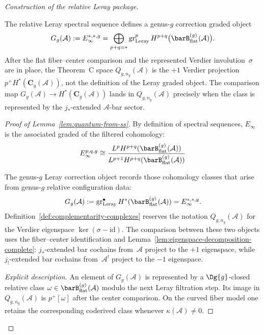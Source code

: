 \begin{proof}[Construction of the relative Leray package]
\begin{lemma}
\label{lem:quantum-from-ss}
The relative Leray spectral sequence defines a genus-$g$ correction
graded object
\begin{equation}
G_g(\mathcal{A})
:= E_\infty^{*,*,g}
= \bigoplus_{p+q=*}
\operatorname{gr}^{p}_{\mathrm{Leray}}
H^{p+q}\bigl(\barB^{(g)}_{\mathrm{flat}}(\mathcal{A})\bigr).
\end{equation}
After the flat fiber--center comparison and the represented Verdier
involution~$\sigma$ are in place, the Theorem~C space
$Q_{g,n_g}(\mathcal{A})$ is the $+1$ Verdier projection
$p^+H^*(\mathbf{C}_g(\mathcal{A}))$, not the definition of the
Leray graded object. The comparison map
$G_g(\mathcal{A})\to H^*(\mathbf{C}_g(\mathcal{A}))$ lands in
$Q_{g,n_g}(\mathcal{A})$ precisely when the class is represented by the
$j_*$-extended $\mathcal{A}$-bar sector.
\end{lemma}

\begin{proof}[Proof of Lemma~\ref{lem:quantum-from-ss}]
By definition of spectral sequences, $E_\infty$ is the associated graded of the
filtered cohomology:
\begin{equation}
E_\infty^{p,q,g} \cong
\frac{L^p H^{p+q}(\barB^{(g)}_{\mathrm{flat}}(\mathcal{A}))}
{L^{p+1} H^{p+q}(\barB^{(g)}_{\mathrm{flat}}(\mathcal{A}))}
\end{equation}

The genus-$g$ Leray correction object records those cohomology
classes that arise from genus-$g$ relative configuration data:
\begin{equation}
G_g(\mathcal{A}) :=
\operatorname{gr}^{\bullet}_{\mathrm{Leray}}
H^*(\barB^{(g)}_{\mathrm{flat}}(\mathcal{A}))
= E_\infty^{*,*,g}.
\end{equation}
Definition~\ref{def:complementarity-complexes} reserves the notation
$Q_{g,n_g}(\mathcal{A})$ for the Verdier eigenspace
$\ker(\sigma-\mathrm{id})$. The comparison between these two objects
uses the fiber--center identification and
Lemma~\ref{lem:eigenspace-decomposition-complete}: $j_*$-extended
bar cochains from~$\mathcal{A}$ project to the $+1$ eigenspace, while
$j_!$-extended bar cochains from~$\mathcal{A}^!$ project to the
$-1$ eigenspace.

\emph{Explicit description.} An element of $G_g(\mathcal{A})$ is
represented by a $\Dg{g}$-closed relative class
$\omega \in \barB^{(g)}_{\mathrm{flat}}(\mathcal{A})$ modulo the
next Leray filtration step. Its image in $Q_{g,n_g}(\mathcal{A})$ is
$p^+[\omega]$ after the center comparison. On the curved fiber model
one retains the corresponding coderived class whenever
$\kappa(\mathcal{A}) \neq 0$.


\end{proof}
\end{proof}
